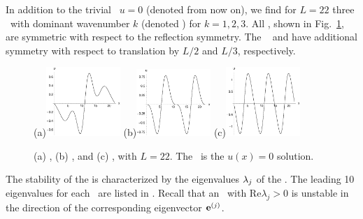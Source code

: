 In addition to the trivial \eqv\ $u=0$ (denoted  from now
on), we find for $L = 22$ three \eqva\ with dominant wavenumber $k$
(denoted ) for $k = 1, 2, 3$.  All {\eqva}, shown in
Fig.~\ref{f:KS22Equil}, are symmetric with respect to the reflection
symmetry. The \eqva\  and  have additional symmetry with respect
to translation by $L/2$ and $L/3$, respectively.

\begin{figure}[t]
\begin{center}
(a)\includegraphics[width=0.25\textwidth]{figs/1wKS22equil.eps}
(b)\includegraphics[width=0.25\textwidth]{figs/2wKS22equil.eps}
(c)\includegraphics[width=0.25\textwidth]{figs/3wKS22equil.eps}
\end{center}
\caption{
(a) , (b) , and (c)
 \eqva, with $L=22$. The  \eqv\ is the $u(x)=0$
solution.
}
\label{f:KS22Equil}
\end{figure}

The stability of the {\eqva} is characterized by the eigenvalues
$\eigExp[j]$ of the \stabmat.  The leading 10 eigenvalues for each
\eqv\ are listed in . Recall that an \eqv\ with $\mathrm{Re}
\lambda_j > 0$ is unstable in the direction of the corresponding
eigenvector $\jEigvec{j}$.

